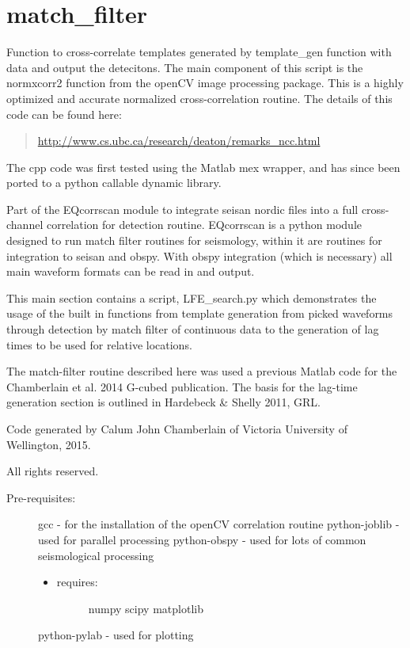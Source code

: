 \documentclass[a4paper,10pt,english]{sphinxmanual}
\begin{document}
\section{match\_filter}
\label{modules:match-filter}\label{modules:module-match_filter}
Function to cross-correlate templates generated by template\_gen function with
data and output the detecitons.  The main component of this script is the
normxcorr2 function from the openCV image processing package.  This is a highly
optimized and accurate normalized cross-correlation routine.  The details of
this code can be found here:
\begin{quote}

\href{http://www.cs.ubc.ca/research/deaton/remarks\_ncc.html}{http://www.cs.ubc.ca/research/deaton/remarks\_ncc.html}
\end{quote}

The cpp code was first tested using the Matlab mex wrapper, and has since been
ported to a python callable dynamic library.

Part of the EQcorrscan module to integrate seisan nordic files into a full
cross-channel correlation for detection routine.
EQcorrscan is a python module designed to run match filter routines for
seismology, within it are routines for integration to seisan and obspy.
With obspy integration (which is necessary) all main waveform formats can be
read in and output.

This main section contains a script, LFE\_search.py which demonstrates the usage
of the built in functions from template generation from picked waveforms
through detection by match filter of continuous data to the generation of lag
times to be used for relative locations.

The match-filter routine described here was used a previous Matlab code for the
Chamberlain et al. 2014 G-cubed publication.  The basis for the lag-time
generation section is outlined in Hardebeck \& Shelly 2011, GRL.

Code generated by Calum John Chamberlain of Victoria University of Wellington,
2015.

All rights reserved.
\begin{description}
\item[{Pre-requisites:}] \leavevmode
gcc             - for the installation of the openCV correlation routine
python-joblib   - used for parallel processing
python-obspy    - used for lots of common seismological processing
\begin{itemize}
\item {} \begin{description}
\item[{requires:}] \leavevmode
numpy
scipy
matplotlib

\end{description}

\end{itemize}

python-pylab    - used for plotting

\end{description}
\end{document}
